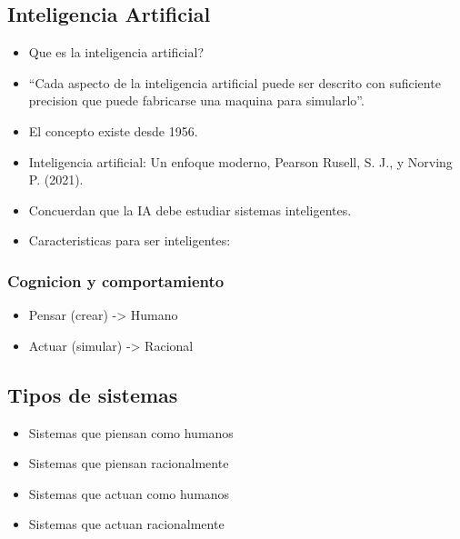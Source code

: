 \documentclass[11pt]{article}
\begin{document}
\subsection{Inteligencia Artificial}
\label{sec:orgb6d3a3e}
\begin{itemize}
\item Que es la inteligencia artificial?
\item ``Cada aspecto de la inteligencia artificial puede ser descrito con suficiente precision que puede fabricarse una maquina para simularlo''.
\item El concepto existe desde 1956.
\item Inteligencia artificial: Un enfoque moderno, Pearson Rusell, S. J., y Norving P. (2021).
\item Concuerdan que la IA debe estudiar sistemas inteligentes.
\item Caracteristicas para ser inteligentes:
\end{itemize}
\subsubsection{Cognicion y comportamiento}
\label{sec:orgf729da0}
\begin{itemize}
\item Pensar (crear) -> Humano
\item Actuar (simular) -> Racional
\end{itemize}
\subsection{Tipos de sistemas}
\label{sec:orgd41c00c}
\begin{itemize}
\item Sistemas que piensan como humanos
\item Sistemas que piensan racionalmente
\item Sistemas que actuan como humanos
\item Sistemas que actuan racionalmente
\end{itemize}
\end{document}
